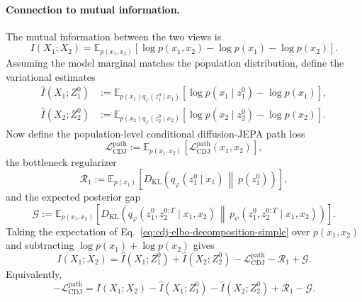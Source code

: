 \documentclass{article}
\newcommand{\E}{\mathbb{E}}
\newcommand{\KL}{D_{\mathrm{KL}}}
\begin{document}
\paragraph{Connection to mutual information.}
The mutual information between the two views is
\begin{equation}
I(X_1;X_2)
=
\E_{p(x_1,x_2)}
\left[
\log p(x_1,x_2)
-
\log p(x_1)
-
\log p(x_2)
\right].
\label{eq:cdj-data-mi-simple}
\end{equation}
Assuming the model marginal matches the population distribution, define the
variational estimates
\begin{align}
\widehat I(X_1;Z_1^0)
&:=
\E_{p(x_1)q_\varphi(z_1^0\mid x_1)}
\left[
\log p(x_1\mid z_1^0)
-
\log p(x_1)
\right],
\label{eq:cdj-ihat-x1z10}
\\
\widehat I(X_2;Z_2^0)
&:=
\E_{p(x_2)q_\varphi(z_2^0\mid x_2)}
\left[
\log p(x_2\mid z_2^0)
-
\log p(x_2)
\right].
\label{eq:cdj-ihat-x2z20}
\end{align}
Now define the population-level conditional diffusion-JEPA path loss
\begin{equation}
\mathcal L_{\mathrm{CDJ}}^{\mathrm{path}}
:=
\E_{p(x_1,x_2)}
\left[
\mathcal L_{\mathrm{CDJ}}^{\mathrm{path}}(x_1,x_2)
\right],
\label{eq:cdj-path-loss-pop-simple}
\end{equation}
the bottleneck regularizer
\begin{equation}
\mathcal R_1
:=
\E_{p(x_1)}
\left[
\KL
\left(
q_\varphi(z_1^0\mid x_1)
\,\middle\|\,
p(z_1^0)
\right)
\right],
\label{eq:cdj-bottleneck-simple}
\end{equation}
and the expected posterior gap
\begin{equation}
\mathcal G
:=
\E_{p(x_1,x_2)}
\left[
\KL
\left(
q_\varphi(z_1^0,z_2^{0:T}\mid x_1,x_2)
\,\middle\|\,
p_\psi(z_1^0,z_2^{0:T}\mid x_1,x_2)
\right)
\right].
\label{eq:cdj-gap-simple}
\end{equation}
Taking the expectation of Eq.~\eqref{eq:cdj-elbo-decomposition-simple} over
$p(x_1,x_2)$ and subtracting $\log p(x_1)+\log p(x_2)$ gives
\begin{equation}
I(X_1;X_2)
=
\widehat I(X_1;Z_1^0)
+
\widehat I(X_2;Z_2^0)
-
\mathcal L_{\mathrm{CDJ}}^{\mathrm{path}}
-
\mathcal R_1
+
\mathcal G.
\label{eq:cdj-mi-decomposition-simple}
\end{equation}
Equivalently,
\begin{equation}
-\mathcal L_{\mathrm{CDJ}}^{\mathrm{path}}
=
I(X_1;X_2)
-
\widehat I(X_1;Z_1^0)
-
\widehat I(X_2;Z_2^0)
+
\mathcal R_1
-
\mathcal G.
\label{eq:cdj-negative-loss-simple}
\end{equation}
\end{document}
